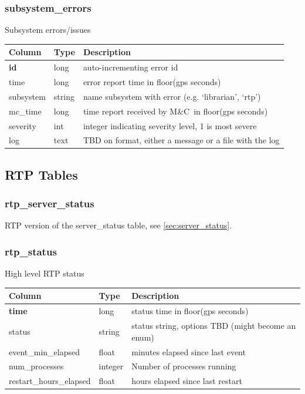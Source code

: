 \documentclass{article}
\newcommand{\mc}{M\&C}
\begin{document}
{\subsubsection{subsystem\_errors}
Subsystem errors/issues
\begin{center}
 \begin{tabular}{| p{4cm} | p{2cm} | p{10cm} |}
\hline
 {\bf Column} & {\bf Type}  & {\bf Description} \\ [0.5ex]  \hline\hline
\textbf{id} & long & auto-incrementing error id\\ \hline
time & long & error report time in floor(gps seconds)\\ \hline
subsystem & string & name subsystem with error (e.g. `librarian', `rtp')\\ \hline
mc\_time & long & time report received by \mc\ in floor(gps seconds) \\ \hline
severity & int & integer indicating severity level, 1 is most severe \\ \hline
log & text & TBD on format, either a message or a file with the log \\ \hline
\end{tabular}
\end{center}




\subsection{RTP Tables}
\subsubsection{rtp\_server\_status}
RTP version of the server\_status table, see \ref{sec:server_status}.

\subsubsection{rtp\_status}
High level RTP status
\begin{center}
 \begin{tabular}{| p{4cm} | p{2cm} | p{10cm} |}
\hline
 {\bf Column} & {\bf Type}  & {\bf Description} \\ [0.5ex]  \hline\hline
\textbf{time} & long & status time in floor(gps seconds)\\ \hline
status & string & status string, options TBD (might become an enum) \\\hline
event\_min\_elapsed & float & minutes elapsed since last event \\\hline
num\_processes & integer & Number of processes running  \\\hline
restart\_hours\_elapsed & float & hours elapsed since last restart \\\hline
\end{tabular}
\end{center}

}
\end{document}
